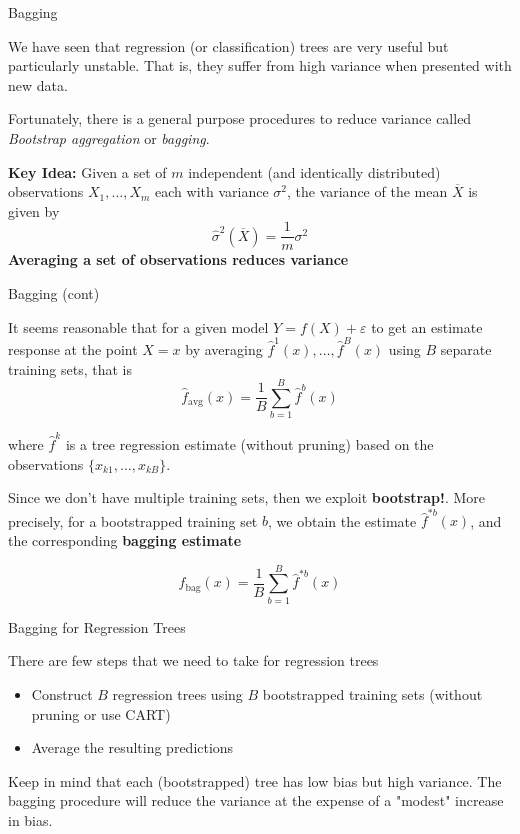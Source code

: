 \documentclass{beamer}
\begin{document}
	\begin{frame}{Bagging}
		
		We have seen that regression (or classification) trees are very useful but particularly unstable. That is, they suffer from high variance when presented with new data. 
		
		Fortunately, there is a general purpose procedures to reduce variance called {\it Bootstrap aggregation} or {\it bagging}. 
		
		{\bf Key Idea:} Given a set of $m$ independent (and identically distributed)  observations $X_1,\ldots, X_m$ each with variance $\sigma^2$, the variance of the mean $\overline{X}$ is given by 
		\begin{equation*}
			\hat{\sigma}^2(\overline{X})= \frac{1}{m} \sigma^2
		\end{equation*}
		{\bf Averaging a set of observations reduces variance}
		
	\end{frame}

\begin{frame}{Bagging (cont)}
	
	It seems reasonable that for a given model $Y=f(X)+\varepsilon$ to get an estimate response at the point $X=x$ by averaging $\hat{f}^1(x), \ldots, \hat{f}^B(x)$ using $B$ separate training sets, that is 
	\begin{equation*}
		\hat{f}_{\textrm{avg}}(x)= \frac{1}{B} \sum_{b=1}^B \hat{f}^b (x)
	\end{equation*}

where $\hat{f}^k$ is a tree regression estimate (without pruning) based on the observations $\{x_{k1},\ldots,x_{kB}\}$.

Since we don't have multiple training sets, then we exploit {\bf bootstrap!}.  More precisely, for a bootstrapped training set $b$, we obtain the estimate $\hat{f}^{*b}(x)$, and the corresponding {\bf bagging estimate}

	\begin{equation*}
	\hat{f}_{\textrm{bag}}(x)= \frac{1}{B} \sum_{b=1}^B \hat{f}^{*b} (x)
\end{equation*}

\end{frame}
	

\begin{frame}{Bagging for Regression Trees}
	
	There are few steps that we need to take for regression trees
	\begin{itemize}
		\item Construct $B$ regression trees using $B$ bootstrapped training sets (without pruning or use CART)
		\item Average the resulting predictions
	\end{itemize}
Keep in mind that each (bootstrapped) tree has low bias but high variance. The bagging procedure will reduce the variance at the expense of a "modest" increase in bias. 

\end{frame}
\end{document}
